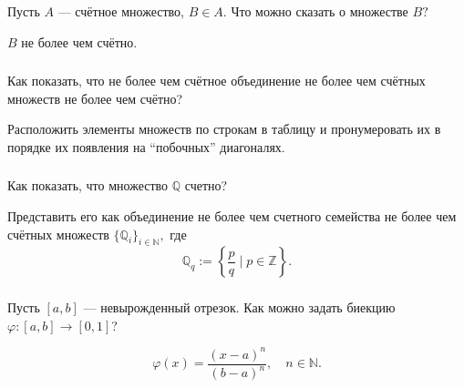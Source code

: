 \documentclass[11pt, a5paper]{article}
\newenvironment{note}[1]{\subsubsection{}}{}
\newenvironment{cloze}[2][\ldots]{\begin{leftbar}}{\end{leftbar}}
\begin{document}
    \begin{note}{3639a29f97084a048aae918aefdb9100}
        Пусть \( A \) --- счётное множество, \( B \in A. \) Что можно сказать о
        множестве \( B? \)

        \begin{cloze}{1}
            \( B \) не более чем счётно.
        \end{cloze}
    \end{note}

    \begin{note}{bad29a5101fe46c3bd91ed4d7f33015b}
        Как показать, что не более чем счётное объединение не более чем счётных
        множеств не более чем счётно?

        \begin{cloze}{1}
            Расположить элементы множеств по строкам в таблицу и пронумеровать
            их в порядке их появления на ``побочных'' диагоналях.
        \end{cloze}
    \end{note}

    \begin{note}{23eae0cde4e049379eab7d391cd31769}
        Как показать, что множество \( \mathbb Q  \) счетно?

        \begin{cloze}{1}
            Представить его как объединение не более чем счетного семейства не
            более чем счётных множеств \( \{ \mathbb Q _i \}_{i \in \mathbb N }
            , \) где \[
                \mathbb Q _q := \left\{ \frac{p}{q} \mid p \in \mathbb Z  \right\}.
            \]
        \end{cloze}
    \end{note}

    \begin{note}{fa0bde6f987c45f9b12f1e7a19f5ed7f}
        Пусть \( [a,  b] \) --- невырожденный отрезок. Как можно задать биекцию
        \( \varphi : [a,  b] \to [0, 1] \)?

        \begin{cloze}{1}
            \[
                \varphi(x) = \frac{(x - a)^{n}}{(b - a)^{n}}, \quad n \in
                \mathbb N.
            \]
        \end{cloze}
    \end{note}
\end{document}
